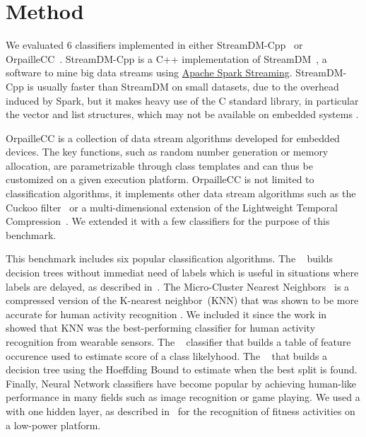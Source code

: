 \section{Method}
We evaluated 6 classifiers implemented in either
StreamDM-Cpp~\cite{StreamDM-CPP} or
OrpailleCC~\cite{OrpailleCC}.  StreamDM-Cpp is a
C++ implementation of StreamDM~\cite{StreamDM}, a
software to mine big data streams using
\href{https://spark.apache.org/streaming/}{Apache
Spark Streaming}. StreamDM-Cpp is usually faster
than StreamDM on small datasets, due to the
overhead induced by Spark, but it makes heavy use
of the C standard library, in particular the
vector and list structures, which may not be
available on embedded systems .

OrpailleCC is a collection of data stream
algorithms developed for embedded devices. The key
functions, such as random number generation or
memory allocation, are parametrizable through
class templates and can thus be customized on a
given execution platform.  OrpailleCC is not
limited to classification algorithms, it
implements other data stream algorithms such as
the Cuckoo filter~\cite{cuckoo} or a
multi-dimensional extension of the Lightweight
Temporal Compression~\cite{multi-ltc}. We extended
it with a few classifiers for the purpose of this
benchmark.

This benchmark includes six popular classification
algorithms.  The
\mondrianforest~\cite{mondrian2014} builds
decision trees without immediat need of labels
which is useful in situations where labels are
delayed, as described
in~\cite{stream_learning_review}.  The
Micro-Cluster Nearest
Neighbors~\cite{mc-nn} is a compressed version of the K-nearest
neighbor~(KNN) that was shown to be more accurate for human activity
recognition . We included
it since the work in~\cite{Janidarmian_2017} showed that KNN was the
best-performing classifier for human activity recognition from wearable
sensors.  The \naivebayes~\cite{naive_bayes}
classifier that builds a table of feature
occurence used to estimate score of a class
likelyhood.
The \hoeffdingtree~\cite{VFDT} that builds a
decision tree using the Hoeffding Bound to
estimate when the best split is found. 
Finally, Neural Network classifiers have
become popular by achieving human-like performance in many fields such as image
recognition or game playing. We used a
\FNN with one hidden layer, as described in~\cite{omid_2019} for the recognition 
of fitness activities on a low-power platform.



